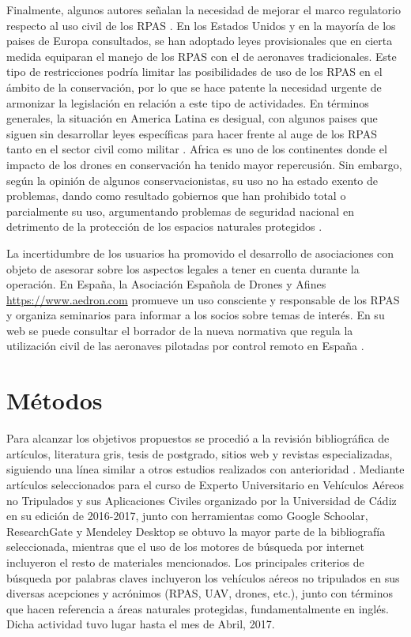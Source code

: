 \documentclass[11pt,]{article}
\begin{document}
Finalmente, algunos autores señalan la necesidad de mejorar el marco
regulatorio respecto al uso civil de los RPAS \citep{Nugraha2016}. En
los Estados Unidos y en la mayoría de los paises de Europa consultados,
se han adoptado leyes provisionales que en cierta medida equiparan el
manejo de los RPAS con el de aeronaves tradicionales. Este tipo de
restricciones podría limitar las posibilidades de uso de los RPAS en el
ámbito de la conservación, por lo que se hace patente la necesidad
urgente de armonizar la legislación en relación a este tipo de
actividades. En términos generales, la situación en America Latina es
desigual, con algunos paises que siguen sin desarrollar leyes
específicas para hacer frente al auge de los RPAS tanto en el sector
civil como militar \citep{Nacion2013}. Africa es uno de los continentes
donde el impacto de los drones en conservación ha tenido mayor
repercusión. Sin embargo, según la opinión de algunos conservacionistas,
su uso no ha estado exento de problemas, dando como resultado gobiernos
que han prohibido total o parcialmente su uso, argumentando problemas de
seguridad nacional en detrimento de la protección de los espacios
naturales protegidos \citep{Andrews2014}.

La incertidumbre de los usuarios ha promovido el desarrollo de
asociaciones con objeto de asesorar sobre los aspectos legales a tener
en cuenta durante la operación. En España, la Asociación Española de
Drones y Afines \url{https://www.aedron.com} promueve un uso consciente
y responsable de los RPAS y organiza seminarios para informar a los
socios sobre temas de interés. En su web se puede consultar el borrador
de la nueva normativa que regula la utilización civil de las aeronaves
pilotadas por control remoto en España \citep{Aedron2017}.

\section{Métodos}\label{metodos}

Para alcanzar los objetivos propuestos se procedió a la revisión
bibliográfica de artículos, literatura gris, tesis de postgrado, sitios
web y revistas especializadas, siguiendo una línea similar a otros
estudios realizados con anterioridad \citet{Linchant2015}. Mediante
artículos seleccionados para el curso de Experto Universitario en
Vehículos Aéreos no Tripulados y sus Aplicaciones Civiles organizado por
la Universidad de Cádiz en su edición de 2016-2017, junto con
herramientas como Google Schoolar, ResearchGate y Mendeley Desktop se
obtuvo la mayor parte de la bibliografía seleccionada, mientras que el
uso de los motores de búsqueda por internet incluyeron el resto de
materiales mencionados. Los principales criterios de búsqueda por
palabras claves incluyeron los vehículos aéreos no tripulados en sus
diversas acepciones y acrónimos (RPAS, UAV, drones, etc.), junto con
términos que hacen referencia a áreas naturales protegidas,
fundamentalmente en inglés. Dicha actividad tuvo lugar hasta el mes de
Abril, 2017.
\end{document}
